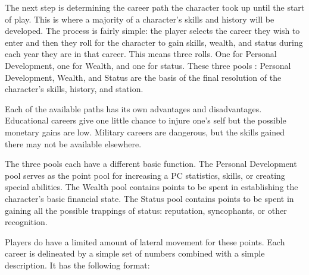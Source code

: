 The next step is determining the career path the character
took up until the start of play. This is where a majority of a character's
skills and history will be developed. The process is fairly simple:
the player selects the career they wish to enter and then they roll 
for the character to gain skills, wealth, and status during each 
year they are in that career. This means three rolls. One for
Personal Development, one for Wealth, and one for status.
These three pools : Personal Development, Wealth, and Status
are the basis of the final resolution of
the character's skills, history, and station.

Each of the available paths has its own advantages and disadvantages.
Educational careers give one little chance to injure one's self but the
possible monetary gains are low.  Military careers are dangerous, but
the skills gained there may not be available elsewhere.

The three pools each have a different basic function.
The Personal Development pool serves as the point pool for
increasing a PC statistics, skills, or creating special abilities.
The Wealth pool contains points to be spent in establishing the
character's basic financial state.
The Status pool contains points to be spent in gaining all the
possible trappings of status: reputation, syncophants, or other recognition.

Players do have a limited amount of lateral movement for these  points.
Each career is delineated by a simple set of numbers combined with a
simple description. It has the following format:

